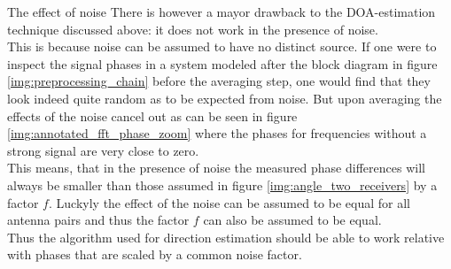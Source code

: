 \begin{subchapter}{The effect of noise}
  There is however a mayor drawback to the DOA-estimation
  technique discussed above: it does not work in the presence of noise. \\

  This is because noise can be assumed to have no distinct source.
  If one were to inspect the signal phases in a system modeled after
  the block diagram in figure \ref{img:preprocessing_chain} before
  the averaging step, one would find that they look indeed quite random
  as to be expected from noise.
  But upon averaging the effects of the noise cancel out as can be seen in figure
  \ref{img:annotated_fft_phase_zoom} where the phases for frequencies
  without a strong signal are very close to zero. \\

  This means, that in the presence of noise the measured phase differences
  will always be smaller than those assumed in figure \ref{img:angle_two_receivers}
  by a factor $f$.
  Luckyly the effect of the noise can be assumed to be equal for
  all antenna pairs and thus the factor $f$ can also be assumed to be equal. \\

  Thus the algorithm used for direction estimation
  should be able to work relative with phases that are
  scaled by a common noise factor.
\end{subchapter}


